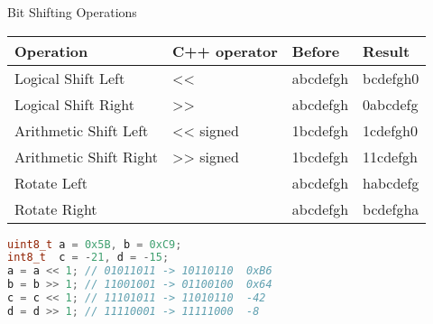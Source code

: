 \begin{withoutheadline}

    
\begin{frame}[fragile]{Bit Shifting Operations}
\begin{tabular}{p{4cm}|p{1.5cm}|p{2cm}|p{2cm}}            \toprule
Operation              & C++ operator & Before & Result \\ \midrule
Logical Shift Left     & <<           & abcdefgh & bcdefgh0 \\
Logical Shift Right    & >>           & abcdefgh & 0abcdefg \\
Arithmetic Shift Left  & <<  signed   & 1bcdefgh & 1cdefgh0 \\
Arithmetic Shift Right & >>  signed   & 1bcdefgh & 11cdefgh \\
Rotate Left            &              & abcdefgh & habcdefg \\
Rotate Right           &              & abcdefgh & bcdefgha \\ \bottomrule
\end{tabular}
\begin{lstlisting}[language=c++,mathescape=true]
uint8_t a = 0x5B, b = 0xC9;
int8_t  c = -21, d = -15;
a = a << 1; // 01011011 -> 10110110  0xB6
b = b >> 1; // 11001001 -> 01100100  0x64
c = c << 1; // 11101011 -> 11010110  -42
d = d >> 1; // 11110001 -> 11111000  -8 
\end{lstlisting}
\end{frame}

\end{withoutheadline}
 
